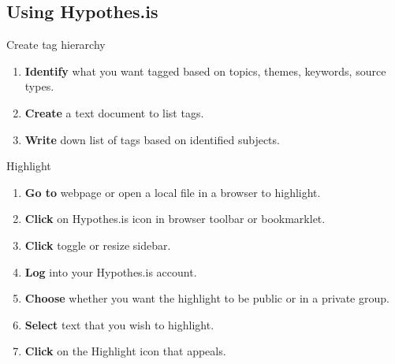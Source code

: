 \documentclass[10pt,a4paper]{article}
\begin{document}
\subsection{Using Hypothes.is}

\begin{textbox}{Create tag hierarchy}
 

  

\begin{enumerate}
\item \textbf{Identify} what you want tagged based on topics, themes, keywords, source types. 
\item \textbf{Create} a text document to list tags.
\item \textbf{Write} down list of tags based on identified subjects.
\end{enumerate}

\end{textbox}


\begin{textbox}{Highlight}
 

  

\begin{enumerate}
\item \textbf{Go to} webpage or open a local file in a browser to highlight. 
\item \textbf{Click} on Hypothes.is icon in browser toolbar or bookmarklet.
\item \textbf{Click} toggle or resize sidebar.
\item \textbf{Log} into your Hypothes.is account.
\item \textbf{Choose} whether you want the highlight to be public or in a private group.
\item \textbf{Select} text that you wish to highlight.
\item \textbf{Click} on the Highlight icon that appeals.

\end{enumerate}

\end{textbox}
\end{document}
